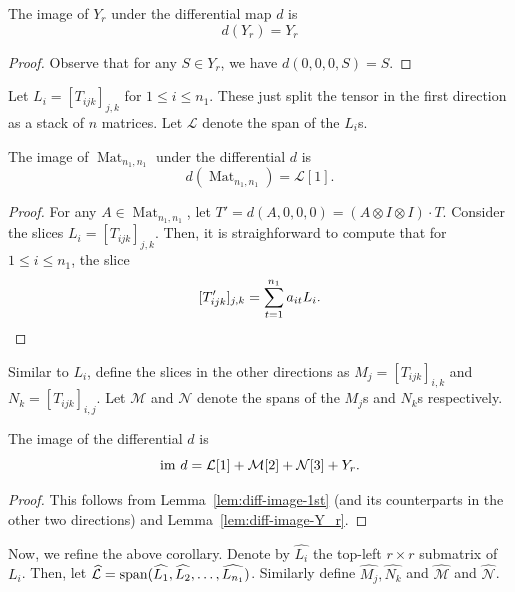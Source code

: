 \documentclass[11pt]{article}
\theoremstyle{definition}
\theoremstyle{remark}
\newcommand{\spa}{{\rm span}}
\newcommand{\Mat}{\operatorname{Mat}}
\newcommand{\im}{{\rm im}}
\begin{document}
\begin{lemma} \label{lem:diff-image-Y_r}
The image of $Y_r$ under the differential map $d$ is 
$$
d(Y_r) = Y_r
$$
\end{lemma}
\begin{proof}
Observe that for any $S \in Y_r$, we have $d(0,0,0,S) = S$. 
\end{proof}

Let $L_i = [T_{ijk}]_{j,k} $ for $1 \leq i \leq n_1$. These just split the tensor in the first direction as a stack of $n$ matrices. Let $\mathcal{L}$ denote the span of the $L_i$s.

\begin{lemma} \label{lem:diff-image-1st}
The image of $\Mat_{n_1,n_1}$ under the differential $d$ is
\begin{equation} \label{eq:image-differential-linear}
d(\Mat_{n_1,n_1}) = \mathcal{L}[1].
\end{equation}
\end{lemma}


\begin{proof}
For any $A \in \Mat_{n_1,n_1}$, let $T' = d(A,0,0,0) = (A \otimes I \otimes I) \cdot T$. Consider the slices $L_i = [T_{ijk}]_{j,k} $. Then, it is straighforward to compute that for $1 \leq i \leq n_1$, the slice
\[
[T'_{ijk}]_{j,k}= \sum_{t = 1}^{n_1} a_{it} L_i.\qedhere
\]
\end{proof}

Similar to $L_i$, define the slices in the other directions as $M_j = [T_{ijk}]_{i,k}$ and $N_k = [T_{ijk}]_{i,j}$. Let $\mathcal{M}$ and $\mathcal{N}$ denote the spans of the $M_j$s and $N_k$s respectively.

\begin{corollary} \label{cor:image-d}
The image of the differential $d$ is
$$
\im\ d = \mathcal{L}[1] + \mathcal{M}[2] + \mathcal{N}[3] + Y_r.
$$
\end{corollary}

\begin{proof}
This follows from 
Lemma~\ref{lem:diff-image-1st} (and its counterparts in the other two directions) and Lemma~\ref{lem:diff-image-Y_r}.
\end{proof}

Now, we refine the above corollary. Denote by $\widehat{L_i}$ the top-left $ r \times r$ submatrix of $L_i$. Then, let $\mathcal{\widehat{L}} = \spa (\widehat{L_1}, \widehat{L_2} ,\dots, \widehat{L_{n_1}})$. Similarly define $\widehat{M_j}, \widehat{N_k}$ and $\mathcal{\widehat{M}}$ and $\mathcal{\widehat{N}}$.
\end{document}
